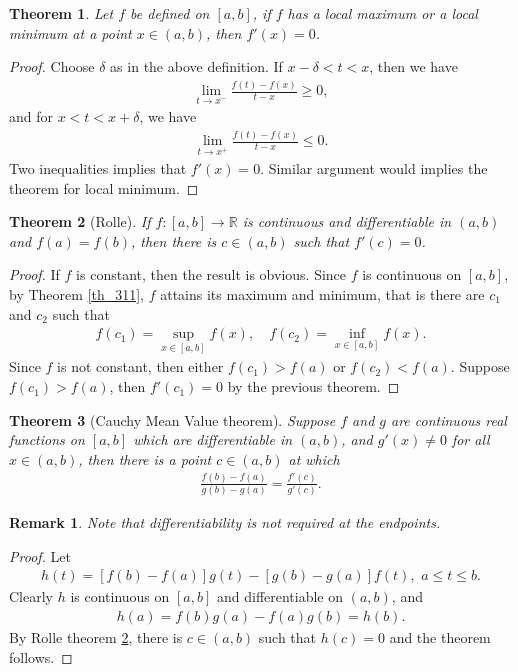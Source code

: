 \documentclass[10pt]{book}
\newtheorem{theorem}{Theorem}[chapter]
\newtheorem{remark}{Remark}[chapter]
\theoremstyle{definition}
\numberwithin{equation}{chapter}
\begin{document}
\begin{theorem}\label{th_45}
Let $f$ be defined on $[a,b]$, if $f$ has a local maximum or a local minimum at a point $x \in (a,b)$, then $f'(x) = 0$.
\end{theorem}
\begin{proof}
Choose $\delta$ as in the above definition. If $x - \delta < t < x$, then we have
\begin{align*}
    \lim_{t\to x^-}\frac{f(t) - f(x)}{t - x} \geq 0,
\end{align*}
and for $x < t < x + \delta$, we have
\begin{align*}
    \lim_{t\to x^+}\frac{f(t) - f(x)}{t - x} \leq 0.
\end{align*}
Two inequalities implies that $f'(x) = 0$. Similar argument would implies the theorem for local minimum.
\end{proof}

\medskip

\begin{theorem}[Rolle]\label{th_46}
If $f: [a,b] \to \mathbb{R}$ is continuous and differentiable in $(a,b)$ and $f(a) = f(b)$, then there is $c \in (a,b)$ such that $f'(c) = 0$.
\end{theorem}
\begin{proof}
If $f$ is constant, then the result is obvious. Since $f$ is continuous on $[a,b]$, by Theorem \ref{th_311}, $f$ attains its maximum and minimum, that is there are $c_1$ and $c_2$ such that
\begin{align*}
    f(c_1) = \sup_{x\in[a,b]} f(x), \quad f(c_2) = \inf_{x\in[a,b]} f(x).
\end{align*}
Since $f$ is not constant, then either $f(c_1) > f(a)$ or $f(c_2) < f(a)$. Suppose $f(c_1) > f(a)$, then $f'(c_1) = 0$ by the previous theorem.
\end{proof}

\medskip

\begin{theorem}[Cauchy Mean Value theorem]\label{th_47}
Suppose $f$ and $g$ are continuous real functions on $[a,b]$ which are differentiable in $(a,b)$, and $g'(x) \neq 0$ for all $x \in (a,b)$, then there is a point $c \in (a,b)$ at which 
\begin{align*}
    \frac{f(b) - f(a)}{g(b) - g(a)} = \frac{f'(c)}{g'(c)}.
\end{align*}
\end{theorem}
\begin{remark}
Note that differentiability is not required at the endpoints.
\end{remark}
\begin{proof}
Let
\begin{align*}
    h(t) = [f(b) - f(a)]g(t) - [g(b) - g(a)]f(t), \,\, a \leq t \leq b.
\end{align*}
Clearly $h$ is continuous on $[a,b]$ and differentiable on $(a,b)$, and
\begin{align*}
    h(a) = f(b)g(a) - f(a)g(b) = h(b).
\end{align*}
By Rolle theorem \ref{th_46}, there is $c \in (a,b)$ such that $h(c) = 0$ and the theorem follows.
\end{proof}
\end{document}
